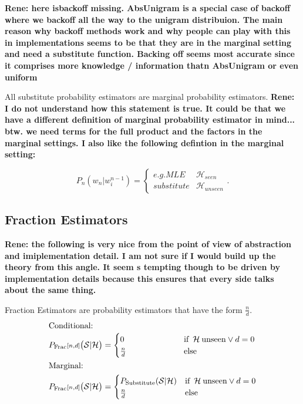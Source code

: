\documentclass[11pt,a4paper]{article}
\newcommand{\Seq}{\mathcal{S}}
\newcommand{\Hist}{\mathcal{H}}
\newcommand{\rp}[1]{\textbf{Rene: #1}}
\begin{document}
\rp{here isbackoff missing. AbsUnigram is a special case of backoff where we backoff all the way to the unigram distribuion. The main reason why backoff methods work and why people can play with this in implementations seems to be that they are in the marginal setting and need a substitute function. Backing off seems most accurate since it comprises more knowledge / information thatn AbsUnigram or even uniform}

  All substitute probability estimators are marginal probability estimators. \rp{I do not understand how this statement is true. It could be that we have a different definition of marginal probability estimator in mind... btw. we need terms for the full product and the factors in the marginal settings. I also like the following defintion in the marginal setting:}

\[ P_n(w_n|w_i^{n-1})= 
\begin{cases}
  e.g. MLE & \Hist_{seen}  \\
  substitute & \Hist_{unseen}
\end{cases}
. \]


  \subsection{Fraction Estimators}
\rp{the following is very nice from the point of view of abstraction and imiplementation detail. I am not sure if I would build up the theory from this angle. It seem s tempting though to be driven by implementation details because this ensures that every side talks about the same thing.}

  Fraction Estimators are probability estimators that have the form $\frac{n}{d}$.
  \begin{alignat}{2}
    \intertext{Conditional:}
    P_\mathrm{Frac}{\scriptstyle[n , d]}\big(\Seq | \Hist\big) &= \begin{cases}
      0\hphantom{_\mathrm{Substitute}(\Seq | \Hist)} & \text{if} \enspace \Hist \: \mathrm{unseen} \lor d = 0 \\
      \frac{n}{d} & \text{else}
    \end{cases} \\
    \intertext{Marginal:}
    P_\mathrm{Frac}{\scriptstyle[n , d]}\big(\Seq | \Hist\big) &= \begin{cases}
      P_\mathrm{Substitute}(\Seq | \Hist) & \text{if} \enspace \Hist \: \mathrm{unseen} \lor d = 0 \\
      \frac{n}{d} & \text{else}
    \end{cases}
  \end{alignat}
\end{document}
